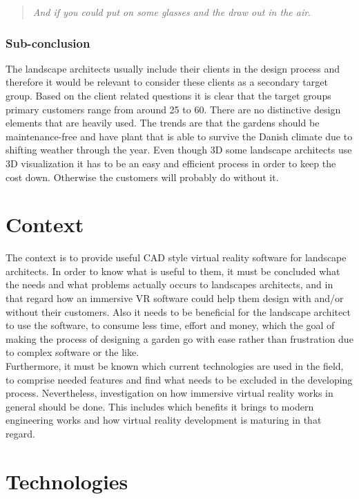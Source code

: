 		\begin{quote}
			\textit{And if you could put on some glasses and the draw out in the air}\label{quote:expertIdeas4}.\\
		\end{quote}
		
		\subsubsection{Sub-conclusion}
		The landscape architects usually include their clients in the design process and therefore it would be relevant to consider these clients as a secondary target group. Based on the client related questions it is clear that the target groups primary customers range from around 25 to 60. There are no distinctive design elements that are heavily used. The trends are that the gardens should be maintenance-free and have plant that is able to survive the Danish climate due to shifting weather through the year.
		Even though 3D some landscape architects use 3D visualization it has to be an easy and efficient process in order to keep the cost down. Otherwise the customers will probably do without it.
		

	\section{Context}
	The context is to provide useful CAD style virtual reality software for landscape architects. In order to know what is useful to them, it must be concluded what the needs and what problems actually occurs to landscapes architects, and in that regard how an immersive VR software could help them design with and/or without their customers. Also it needs to be beneficial for the landscape architect to use the software, to consume less time, effort and money, which the goal of making the process of designing a garden go with ease rather than frustration due to complex software or the like. \\
	
	Furthermore, it must be known which current technologies are used in the field, to comprise needed features and find what needs to be excluded in the developing process. Nevertheless, investigation on how immersive virtual reality works in general should be done. This includes which benefits it brings to modern engineering works and how virtual reality development is maturing in that regard.
			
	\section{Technologies}\label{sec:technologies}			

